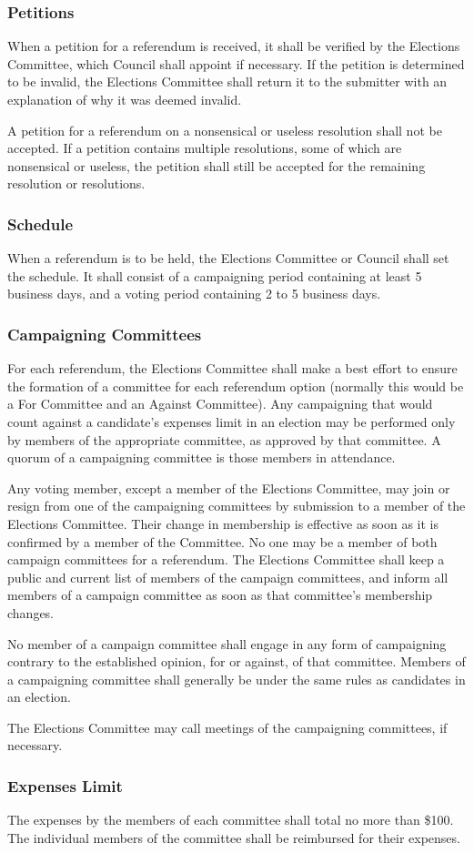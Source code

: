 \subsubsection{Petitions}
When a petition for a referendum is received, it shall be verified by the Elections Committee, which Council shall appoint if necessary.
If the petition is determined to be invalid, the Elections Committee shall return it to the submitter with an explanation of why it was deemed invalid.

A petition for a referendum on a nonsensical or useless resolution shall not be accepted.
If a petition contains multiple resolutions, some of which are nonsensical or useless, the petition shall still be accepted for the remaining resolution or resolutions.

\subsubsection{Schedule}
When a referendum is to be held, the Elections Committee or Council shall set the schedule.
It shall consist of a campaigning period containing at least 5 business days, and a voting period containing 2 to 5 business days.

\subsubsection{Campaigning Committees}
For each referendum, the Elections Committee shall make a best effort to ensure the formation of a committee for each referendum option (normally this would be a For Committee and an Against Committee).
Any campaigning that would count against a candidate's expenses limit in an election may be performed only by members of the appropriate committee, as approved by that committee.
A quorum of a campaigning committee is those members in attendance.

Any voting member, except a member of the Elections Committee, may join or resign from one of the campaigning committees by submission to a member of the Elections Committee.
Their change in membership is effective as soon as it is confirmed by a member of the Committee.
No one may be a member of both campaign committees for a referendum.
The Elections Committee shall keep a public and current list of members of the campaign committees, and inform all members of a campaign committee as soon as that committee's membership changes.

No member of a campaign committee shall engage in any form of campaigning contrary to the established opinion, for or against, of that committee.
Members of a campaigning committee shall generally be under the same rules as candidates in an election.

The Elections Committee may call meetings of the campaigning committees, if necessary.

\subsubsection{Expenses Limit}
The expenses by the members of each committee shall total no more than \$100.
The individual members of the committee shall be reimbursed for their expenses.
